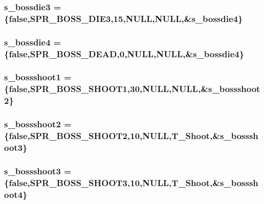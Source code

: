 \label{WL__ACT2_8C_a8e438ad726c055153a6e3bf78abb75c9}
\hypertarget{WL__ACT2_8C_afc0920cb615eb0e224d89899cc8d80ed}{
\subsubsection[{s\_\-bossdie3}]{ {\bf s\_\-bossdie3} = \{false,SPR\_\-BOSS\_\-DIE3,15,NULL,NULL,\&{\bf s\_\-bossdie4}\}}}
\label{WL__ACT2_8C_afc0920cb615eb0e224d89899cc8d80ed}
\hypertarget{WL__ACT2_8C_a498c2621ad46704da3ca7170753775a4}{
\subsubsection[{s\_\-bossdie4}]{ {\bf s\_\-bossdie4} = \{false,SPR\_\-BOSS\_\-DEAD,0,NULL,NULL,\&{\bf s\_\-bossdie4}\}}}
\label{WL__ACT2_8C_a498c2621ad46704da3ca7170753775a4}
\hypertarget{WL__ACT2_8C_a70bba3f03ab51f1e1837358a62d0dd4d}{
\subsubsection[{s\_\-bossshoot1}]{ {\bf s\_\-bossshoot1} = \{false,SPR\_\-BOSS\_\-SHOOT1,30,NULL,NULL,\&{\bf s\_\-bossshoot2}\}}}
\label{WL__ACT2_8C_a70bba3f03ab51f1e1837358a62d0dd4d}
\hypertarget{WL__ACT2_8C_aaa374c93372be8abb5ed60ea25234fab}{
\subsubsection[{s\_\-bossshoot2}]{ {\bf s\_\-bossshoot2} = \{false,SPR\_\-BOSS\_\-SHOOT2,10,NULL,T\_\-Shoot,\&{\bf s\_\-bossshoot3}\}}}
\label{WL__ACT2_8C_aaa374c93372be8abb5ed60ea25234fab}
\hypertarget{WL__ACT2_8C_a24c6ef26a80f794833d9a763fef69be2}{
\subsubsection[{s\_\-bossshoot3}]{ {\bf s\_\-bossshoot3} = \{false,SPR\_\-BOSS\_\-SHOOT3,10,NULL,T\_\-Shoot,\&{\bf s\_\-bossshoot4}\}}}

